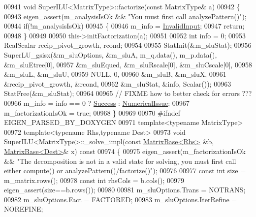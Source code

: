\begin{DoxyCode}
00941 \textcolor{keywordtype}{void} SuperILU<MatrixType>::factorize(\textcolor{keyword}{const} MatrixType& a)
00942 \{
00943   eigen\_assert(m\_analysisIsOk && \textcolor{stringliteral}{"You must first call analyzePattern()"});
00944   \textcolor{keywordflow}{if}(!m\_analysisIsOk)
00945   \{
00946     m\_info = \hyperlink{group__enums_gga85fad7b87587764e5cf6b513a9e0ee5ea945604f62795ffc70aedf2bd12ea0434}{InvalidInput};
00947     \textcolor{keywordflow}{return};
00948   \}
00949   
00950   this->initFactorization(a);
00951 
00952   \textcolor{keywordtype}{int} info = 0;
00953   RealScalar recip\_pivot\_growth, rcond;
00954 
00955   StatInit(&m\_sluStat);
00956   SuperLU\_gsisx(&m\_sluOptions, &m\_sluA, m\_q.data(), m\_p.data(), &m\_sluEtree[0],
00957                 &m\_sluEqued, &m\_sluRscale[0], &m\_sluCscale[0],
00958                 &m\_sluL, &m\_sluU,
00959                 NULL, 0,
00960                 &m\_sluB, &m\_sluX,
00961                 &recip\_pivot\_growth, &rcond,
00962                 &m\_sluStat, &info, Scalar());
00963   StatFree(&m\_sluStat);
00964 
00965   \textcolor{comment}{// FIXME how to better check for errors ???}
00966   m\_info = info == 0 ? \hyperlink{group__enums_gga85fad7b87587764e5cf6b513a9e0ee5ea52581b035f4b59c203b8ff999ef5fcea}{Success} : \hyperlink{group__enums_gga85fad7b87587764e5cf6b513a9e0ee5eaaf9b736d310a664e7729d163a035cc5f}{NumericalIssue};
00967   m\_factorizationIsOk = \textcolor{keyword}{true};
00968 \}
00969 
00970 \textcolor{preprocessor}{#ifndef EIGEN\_PARSED\_BY\_DOXYGEN}
00971 \textcolor{keyword}{template}<\textcolor{keyword}{typename} MatrixType>
00972 \textcolor{keyword}{template}<\textcolor{keyword}{typename} Rhs,\textcolor{keyword}{typename} Dest>
00973 \textcolor{keywordtype}{void} SuperILU<MatrixType>::\_solve\_impl(\textcolor{keyword}{const} \hyperlink{group___core___module_class_eigen_1_1_matrix_base}{MatrixBase<Rhs>} &b, 
      \hyperlink{group___core___module_class_eigen_1_1_matrix_base}{MatrixBase<Dest>}& x)\textcolor{keyword}{ const}
00974 \textcolor{keyword}{}\{
00975   eigen\_assert(m\_factorizationIsOk && \textcolor{stringliteral}{"The decomposition is not in a valid state for solving, you must
       first call either compute() or analyzePattern()/factorize()"});
00976 
00977   \textcolor{keyword}{const} \textcolor{keywordtype}{int} size = m\_matrix.rows();
00978   \textcolor{keyword}{const} \textcolor{keywordtype}{int} rhsCols = b.cols();
00979   eigen\_assert(size==b.rows());
00980 
00981   m\_sluOptions.Trans = NOTRANS;
00982   m\_sluOptions.Fact = FACTORED;
00983   m\_sluOptions.IterRefine = NOREFINE;

\end{DoxyCode}
